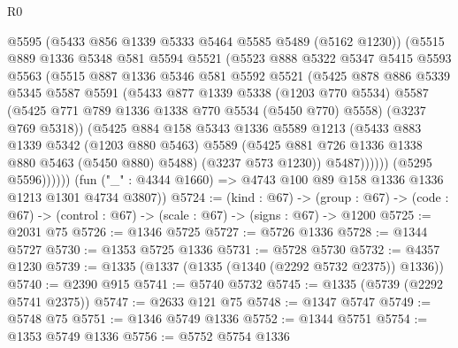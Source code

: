 \begin{lexlean}{R0}
\begin{coremodule}
                  @5595
                  (@5433 @856 @1339 @5333 @5464 @5585 @5489 (@5162 @1230))
                  (@5515
                    @889
                    @1336
                    @5348
                    @581
                    @5594
                    @5521
                    (@5523
                      @888
                      @5322
                      @5347
                      @5415
                      @5593
                      @5563
                      (@5515
                        @887
                        @1336
                        @5346
                        @581
                        @5592
                        @5521
                        (@5425
                          @878
                          @886
                          @5339
                          @5345
                          @5587
                          @5591
                          (@5433
                            @877
                            @1339
                            @5338
                            (@1203 @770 @5534)
                            @5587
                            (@5425 @771 @789 @1336 @1338 @770 @5534 (@5450 @770) @5558)
                            (@3237 @769 @5318))
                          (@5425
                            @884
                            @158
                            @5343
                            @1336
                            @5589
                            @1213
                            (@5433
                              @883
                              @1339
                              @5342
                              (@1203 @880 @5463)
                              @5589
                              (@5425 @881 @726 @1336 @1338 @880 @5463 (@5450 @880) @5488)
                              (@3237 @573 @1230))
                            @5487))))))
                (@5295 @5596))))))
      (fun ("_" : @4344 @1660) => @4743 @100 @89 @158 @1336 @1336 @1213 @1301 @4734 @3807))
@5724 := (kind : @67) ->
  (group : @67) -> (code : @67) -> (control : @67) -> (scale : @67) -> (signs : @67) -> @1200
@5725 := @2031 @75
@5726 := @1346 @5725
@5727 := @5726 @1336
@5728 := @1344 @5727
@5730 := @1353 @5725 @1336
@5731 := @5728 @5730
@5732 := @4357 @1230
@5739 := @1335 (@1337 (@1335 (@1340 (@2292 @5732 @2375)) @1336))
@5740 := @2390 @915
@5741 := @5740 @5732
@5745 := @1335 (@5739 (@2292 @5741 @2375))
@5747 := @2633 @121 @75
@5748 := @1347 @5747
@5749 := @5748 @75
@5751 := @1346 @5749 @1336
@5752 := @1344 @5751
@5754 := @1353 @5749 @1336
@5756 := @5752 @5754 @1336

\end{coremodule}
\end{lexlean}
